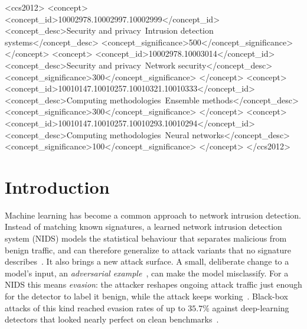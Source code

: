 \documentclass[acmtog,nonacm,pbalance]{acmart}
\begin{document}
\begin{CCSXML}
<ccs2012>
 <concept>
  <concept_id>10002978.10002997.10002999</concept_id>
  <concept_desc>Security and privacy~Intrusion detection systems</concept_desc>
  <concept_significance>500</concept_significance>
 </concept>
 <concept>
  <concept_id>10002978.10003014</concept_id>
  <concept_desc>Security and privacy~Network security</concept_desc>
  <concept_significance>300</concept_significance>
 </concept>
 <concept>
  <concept_id>10010147.10010257.10010321.10010333</concept_id>
  <concept_desc>Computing methodologies~Ensemble methods</concept_desc>
  <concept_significance>300</concept_significance>
 </concept>
 <concept>
  <concept_id>10010147.10010257.10010293.10010294</concept_id>
  <concept_desc>Computing methodologies~Neural networks</concept_desc>
  <concept_significance>100</concept_significance>
 </concept>
</ccs2012>
\end{CCSXML}



\maketitle

\section{Introduction}\label{sec:intro}

Machine learning has become a common approach to network intrusion detection.
Instead of matching known signatures, a learned network intrusion detection
system (NIDS) models the statistical behaviour that separates malicious from
benign traffic, and can therefore generalize to attack variants that no
signature describes~\cite{boutaba2018comprehensive,wang2021machine}. It also
brings a new attack surface. A small, deliberate change to a model's input,
an \emph{adversarial example}~\cite{szegedy2014intriguing,goodfellow2014explaining},
can make the model misclassify. For a NIDS this means \emph{evasion}: the
attacker reshapes ongoing attack traffic just enough for the detector to label
it benign, while the attack keeps working~\cite{he2023adversarial}. Black-box
attacks of this kind reached evasion rates of up to $35.7\%$ against
deep-learning detectors that looked nearly perfect on clean
benchmarks~\cite{zhang2020tiki}.
\end{document}
